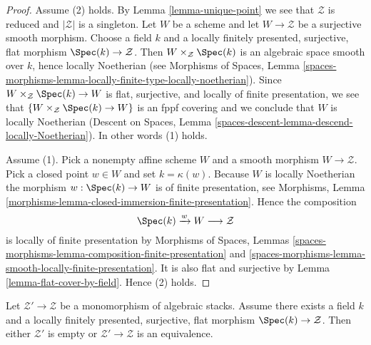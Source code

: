 \begin{proof}
Assume (2) holds. By
Lemma \ref{lemma-unique-point}
we see that $\mathcal{Z}$ is reduced and $|\mathcal{Z}|$ is a singleton.
Let $W$ be a scheme and let $W \to \mathcal{Z}$ be a surjective smooth
morphism. Choose a field $k$ and a locally finitely presented, surjective,
flat morphism $\Spec(k) \to \mathcal{Z}$.
Then $W \times_\mathcal{Z} \Spec(k)$ is an algebraic space
smooth over $k$, hence locally Noetherian (see
Morphisms of Spaces, Lemma
\ref{spaces-morphisms-lemma-locally-finite-type-locally-noetherian}).
Since $W \times_\mathcal{Z} \Spec(k) \to W$
is flat, surjective, and locally of finite presentation, we see
that $\{W \times_\mathcal{Z} \Spec(k) \to W\}$ is an fppf covering
and we conclude that $W$ is locally Noetherian
(Descent on Spaces, Lemma
\ref{spaces-descent-lemma-descend-locally-Noetherian}).
In other words (1) holds.

\medskip\noindent
Assume (1). Pick a nonempty affine scheme $W$ and a smooth morphism
$W \to \mathcal{Z}$. Pick a closed point $w \in W$ and set
$k = \kappa(w)$. Because $W$ is locally Noetherian the morphism
$w : \Spec(k) \to W$ is of finite presentation, see
Morphisms, Lemma \ref{morphisms-lemma-closed-immersion-finite-presentation}.
Hence the composition
$$
\Spec(k) \xrightarrow{w} W \longrightarrow \mathcal{Z}
$$
is locally of finite presentation by
Morphisms of Spaces, Lemmas
\ref{spaces-morphisms-lemma-composition-finite-presentation} and
\ref{spaces-morphisms-lemma-smooth-locally-finite-presentation}.
It is also flat and surjective by
Lemma \ref{lemma-flat-cover-by-field}.
Hence (2) holds.
\end{proof}

\begin{lemma}
\label{lemma-monomorphism-into-point}
Let $\mathcal{Z}' \to \mathcal{Z}$ be a monomorphism of algebraic stacks.
Assume there exists a field $k$ and a locally finitely presented, surjective,
flat morphism $\Spec(k) \to \mathcal{Z}$. Then either $\mathcal{Z}'$
is empty or $\mathcal{Z}' \to \mathcal{Z}$ is an equivalence.
\end{lemma}

